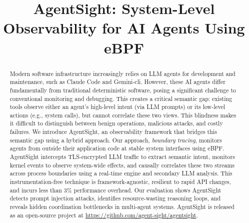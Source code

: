 \documentclass[sigplan,10pt]{acmart}
\begin{document}
\title{AgentSight: System-Level Observability for AI Agents Using eBPF}


\author{}


\sloppy
\begin{abstract}
    Modern software infrastructure increasingly relies on LLM agents for development and maintenance, such as Claude Code and Gemini-cli. However, these AI agents differ fundamentally from traditional deterministic software, posing a significant challenge to conventional monitoring and debugging. This creates a critical semantic gap: existing tools observe either an agent's high-level intent (via LLM prompts) or its low-level actions (e.g., system calls), but cannot correlate these two views. This blindness makes it difficult to distinguish between benign operations, malicious attacks, and costly failures. We introduce AgentSight, an observability framework that bridges this semantic gap using a hybrid approach. Our approach, \emph{boundary tracing}, monitors agents from outside their application code at stable system interfaces using eBPF. AgentSight intercepts TLS-encrypted LLM traffic to extract semantic intent, monitors kernel events to observe system-wide effects, and causally correlates these two streams across process boundaries using a real-time engine and secondary LLM analysis. This instrumentation-free technique is framework-agnostic, resilient to rapid API changes, and incurs less than 3\% performance overhead. Our evaluation shows AgentSight detects prompt injection attacks, identifies resource-wasting reasoning loops, and reveals hidden coordination bottlenecks in multi-agent systems. AgentSight is released as an open-source project at \url{https://github.com/agent-sight/agentsight}.
\end{abstract}

\end{document}
